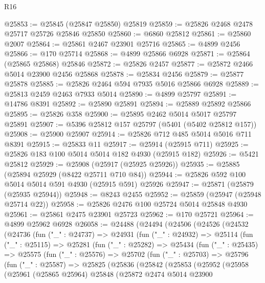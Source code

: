 \begin{lexlean}{R16}
\begin{coremodule}
@25853 := @25845 (@25847 @25850) @25819
@25859 := @25826 @2468 @2478 @25717 @25726 @25846 @25850
@25860 := @6860 @25812
@25861 := @25860 @2007
@25864 := @25861 @2467 @23901 @25716
@25865 := @4899 @2456
@25866 := @170 @25714
@25868 := @4899 @25866 @6928
@25871 := @25864 (@25865 @25868) @25846
@25872 := @25826 @2457
@25877 := @25872 @2466 @5014 @23900 @2456 @25868
@25878 := @25834 @2456
@25879 := @25877 @25878
@25885 := @25826 @2464 @594 @7935 @5016 @25866 @6928
@25889 := @25813 @2459 @2463 @7933 @5014
@25890 := @4899 @25797
@25891 := @14786 @8391
@25892 := @25890 @25891
@25894 := @25889 @25892 @25866
@25895 := @25826 @358
@25900 := @25895 @2462 @5014 @5017 @25797 @25891
@25907 := @5396 @25812 @157 @25797 (@5401 (@5402 @25812 @157))
@25908 := @25900 @25907
@25914 := @25826 @712 @485 @5014 @5016 @711 @8391
@25915 := @25833 @11
@25917 := @25914 (@25915 @711)
@25925 := @25826 @183 @100 @5014 @5014 @182 @4930 (@25915 @182)
@25926 := @5421 @25812
@25929 := @25908 (@25917 (@25925 @25926))
@25935 := @25885 (@25894 @25929 (@8422 @25711 @710 @84))
@25944 := @25826 @592 @100 @5014 @5014 @591 @4930 (@25915 @591) @25926
@25947 := @25871 (@25879 (@25935 @25944))
@25948 := @8243 @2455
@25952 := @25859 (@25947 (@25948 @25714 @22))
@25958 := @25826 @2476 @100 @25724 @5014 @25848 @4930
@25961 := @25861 @2475 @23901 @25723
@25962 := @170 @25721
@25964 := @4899 @25962 @6928
@26058 := @24488
    (@24494
      (@24506
        (@24526
          (@24532
            (@24736
              (fun ("_" : @24737) =>
              @24931
                (fun ("_" : @24932) =>
                @25114
                  (fun ("_" : @25115) =>
                  @25281
                    (fun ("_" : @25282) =>
                    @25434
                      (fun ("_" : @25435) =>
                      @25575
                        (fun ("_" : @25576) =>
                        @25702
                          (fun ("_" : @25703) =>
                          @25796
                            (fun ("_" : @25587) =>
                            @25825
                              (@25836
                                (@25842
                                  (@25853
                                    (@25952
                                      (@25958
                                        (@25961
                                          (@25865 @25964)
                                          @25848
                                          (@25872
                                            @2474
                                            @5014
                                            @23900

\end{coremodule}
\end{lexlean}

